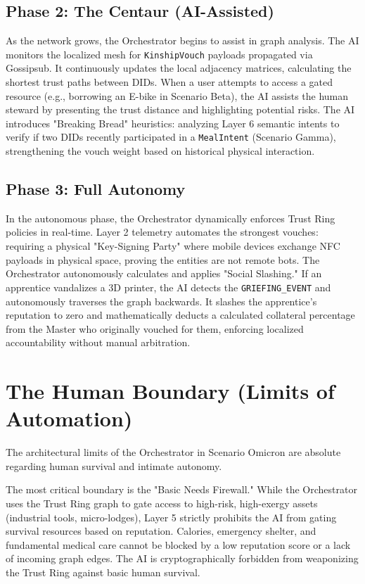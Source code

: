 \subsection{Phase 2: The Centaur (AI-Assisted)}
As the network grows, the Orchestrator begins to assist in graph analysis. The AI monitors the localized mesh for \texttt{KinshipVouch} payloads propagated via Gossipsub. It continuously updates the local adjacency matrices, calculating the shortest trust paths between DIDs. 
When a user attempts to access a gated resource (e.g., borrowing an E-bike in Scenario Beta), the AI assists the human steward by presenting the trust distance and highlighting potential risks. The AI introduces "Breaking Bread" heuristics: analyzing Layer 6 semantic intents to verify if two DIDs recently participated in a \texttt{MealIntent} (Scenario Gamma), strengthening the vouch weight based on historical physical interaction.

\subsection{Phase 3: Full Autonomy}
In the autonomous phase, the Orchestrator dynamically enforces Trust Ring policies in real-time. Layer 2 telemetry automates the strongest vouches: requiring a physical "Key-Signing Party" where mobile devices exchange NFC payloads in physical space, proving the entities are not remote bots. 
The Orchestrator autonomously calculates and applies "Social Slashing." If an apprentice vandalizes a 3D printer, the AI detects the \texttt{GRIEFING\_EVENT} and autonomously traverses the graph backwards. It slashes the apprentice's reputation to zero and mathematically deducts a calculated collateral percentage from the Master who originally vouched for them, enforcing localized accountability without manual arbitration.

\section{The Human Boundary (Limits of Automation)}
The architectural limits of the Orchestrator in Scenario Omicron are absolute regarding human survival and intimate autonomy.

The most critical boundary is the "Basic Needs Firewall." While the Orchestrator uses the Trust Ring graph to gate access to high-risk, high-exergy assets (industrial tools, micro-lodges), Layer 5 strictly prohibits the AI from gating survival resources based on reputation. Calories, emergency shelter, and fundamental medical care cannot be blocked by a low reputation score or a lack of incoming graph edges. The AI is cryptographically forbidden from weaponizing the Trust Ring against basic human survival.

